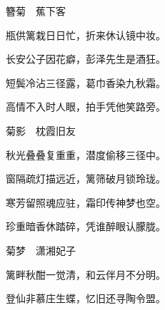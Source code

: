 \begin{poem}
    \emptypl
    \begin{pl}

        簪菊　蕉下客
    \end{pl}
    \begin{pl}

        瓶供篱栽日日忙，折来休认镜中妆。
    \end{pl}
    \begin{pl}

        长安公子因花癖，彭泽先生是酒狂。
    \end{pl}
    \begin{pl}

        短鬓冷沾三径露，葛巾香染九秋霜。
    \end{pl}
    \begin{pl}

        高情不入时人眼，拍手凭他笑路旁。
    \end{pl}

    \emptypl
    \begin{pl}

        菊影　枕霞旧友
    \end{pl}
    \begin{pl}

        秋光叠叠复重重，潜度偷移三径中。
    \end{pl}
    \begin{pl}

        窗隔疏灯描远近，篱筛破月锁玲珑。
    \end{pl}
    \begin{pl}

        寒芳留照魂应驻，霜印传神梦也空。
    \end{pl}
    \begin{pl}

        珍重暗香休踏碎，凭谁醉眼认朦胧。
    \end{pl}

    \emptypl
    \begin{pl}

        菊梦　潇湘妃子
    \end{pl}
    \begin{pl}

        篱畔秋酣一觉清，和云伴月不分明。
    \end{pl}
    \begin{pl}

        登仙非慕庄生蝶，忆旧还寻陶令盟。
    \end{pl}
    \begin{pl}


\end{pl}
\end{poem}
